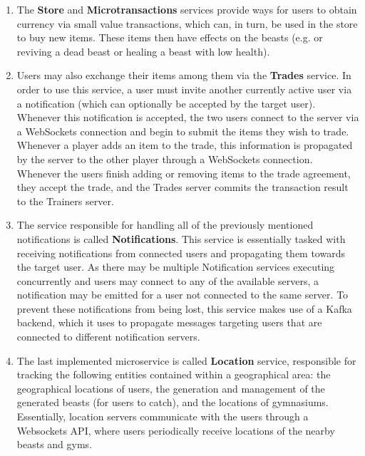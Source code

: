 \begin{enumerate}
    \item The \textbf{Store} and \textbf{Microtransactions} services provide ways for users to obtain currency via small value transactions, which can, in turn, be used in the store to buy new items. These items then have effects on the beasts (e.g. or reviving a dead beast or healing a beast with low health).

    \item Users may also exchange their items among them via the \textbf{Trades} service. In order to use this service, a user must invite another currently active user via a notification (which can optionally be accepted by the target user). Whenever this notification is accepted, the two users connect to the server via a WebSockets connection and begin to submit the items they wish to trade. Whenever a player adds an item to the trade, this information is propagated by the server to the other player through a WebSockets connection. Whenever the users finish adding or removing items to the trade agreement, they accept the trade, and the Trades server commits the transaction result to the Trainers server.

    \item The service responsible for handling all of the previously mentioned notifications is called \textbf{Notifications}. This service is essentially tasked with receiving notifications from connected users and propagating them towards the target user. As there may be multiple Notification services executing concurrently and users may connect to any of the available servers, a notification may be emitted for a user not connected to the same server. To prevent these notifications from being lost, this service makes use of a Kafka~\cite{apache_kafka} backend, which it uses to propagate messages targeting users that are connected to different notification servers.

    \item The last implemented microservice is called \textbf{Location} service, responsible for tracking the following entities contained within a geographical area: the geographical locations of users, the generation and management of the generated beasts (for users to catch), and the locations of gymnasiums. Essentially, location servers communicate with the users through a Websockets API, where users periodically receive locations of the nearby beasts and gyms. 
\end{enumerate}


